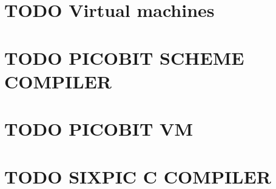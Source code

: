 \documentclass[11pt]{article}
\begin{document}
\section{{\bfseries\sffamily TODO} Virtual machines}
\label{sec-10}

\section{{\bfseries\sffamily TODO} PICOBIT SCHEME COMPILER}
\label{sec-11}

\section{{\bfseries\sffamily TODO} PICOBIT VM}
\label{sec-12}

\section{{\bfseries\sffamily TODO} SIXPIC C COMPILER}
\label{sec-13}
\end{document}
